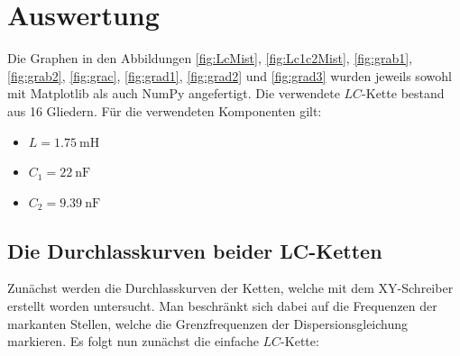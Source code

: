 
\section{Auswertung}
\label{sec:Auswertung}
Die Graphen in den Abbildungen \ref{fig:LcMist}, \ref{fig:Lc1c2Mist}, \ref{fig:grab1}, \ref{fig:grab2}, \ref{fig:grac}, \ref{fig:grad1}, \ref{fig:grad2} und \ref{fig:grad3} wurden jeweils sowohl mit Matplotlib \cite{matplotlib} als auch NumPy \cite{numpy} angefertigt. Die verwendete $LC$-Kette bestand aus 16 Gliedern. Für die verwendeten Komponenten gilt:
\begin{itemize}
	\item $L=\SI{1.75}{\milli\henry}$
	\item $C_1=\SI{22}{\nano\farad}$
	\item $C_2=\SI{9.39}{\nano\farad}$
\end{itemize}
	

\subsection{Die Durchlasskurven beider LC-Ketten}
Zunächst werden die Durchlasskurven der Ketten, welche mit dem XY-Schreiber
 erstellt worden untersucht. Man beschränkt sich dabei auf die Frequenzen der
  markanten Stellen, welche die Grenzfrequenzen der Dispersionsgleichung
	 markieren. Es folgt nun zunächst die einfache $LC$-Kette:


